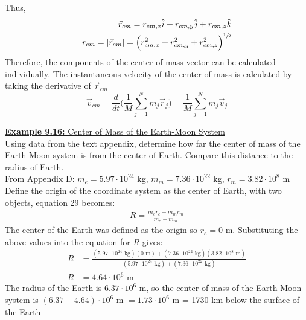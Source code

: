 \documentclass[a4paper]{article}
\let\bf\textbf
\begin{document}
Thus, 
\begin{align*}
    \vec{r}_{cm} = r_{cm,x}\hat{i} + r_{cm,y}\hat{j} + r_{cm,z}\hat{k}\\
    r_{cm} = |\vec{r}_{cm}| = \Big(r^2_{cm,x} + r^2_{cm,y} + r^2_{cm,z}\Big)^{\sfrac{1}{2}}
\end{align*}
Therefore, the components of the center of mass vector can be calculated individually. The instantaneous velocity of the center of mass is calculated by taking the derivative of $\vec{r}_{cm}$
\begin{equation}
    \vec{v}_{cm} = \frac{d}{dt}\bigg(\frac{1}{M}\sum_{j = 1}^{N}m_j\vec{r}_j\bigg) = \frac{1}{M}\sum_{j = 1}^{N}m_j\vec{v}_j
\end{equation}

\begin{shaded}
    \underline{\bf{Example 9.16:} Center of Mass of the Earth-Moon System}
    \vspace{2mm}\\
    Using data from the text appendix, determine how far the center of mass of the Earth-Moon system is from the center of Earth. Compare this distance to the radius of Earth.
    \vspace{1mm}\\
    From Appendix D: $m_e = 5.97 \cdot 10^{24}$ kg, $m_m = 7.36 \cdot 10^{22}$ kg, $r_m = 3.82 \cdot 10^{8}$ m
    \vspace{1mm}\\
    Define the origin of the coordinate system as the center of Earth, with two objects, equation 29 becomes:
    \begin{align*}
        R = \frac{m_e r_e + m_m r_m}{m_e + m_m}
    \end{align*}
    The center of the Earth was defined as the origin so $r_e = 0$ m. Substituting the above values into the equation for $R$ gives:
    \begin{align*}
        R &= \frac{(5.97 \cdot 10^{24}\text{ kg})(0\text{ m}) + (7.36 \cdot 10^{22}\text{ kg})(3.82 \cdot 10^8\text{ m})}{(5.97 \cdot 10^{24}\text{ kg}) + (7.36 \cdot 10^{22}\text{ kg})}\\
        R &= 4.64 \cdot 10^6\text{ m}
    \end{align*}
    The radius of the Earth is $6.37 \cdot 10^6$ m, so the center of mass of the Earth-Moon system is $(6.37 - 4.64) \cdot 10^6$ m $= 1.73 \cdot 10^6$ m = 1730 km below the surface of the Earth
\end{shaded}
\end{document}
